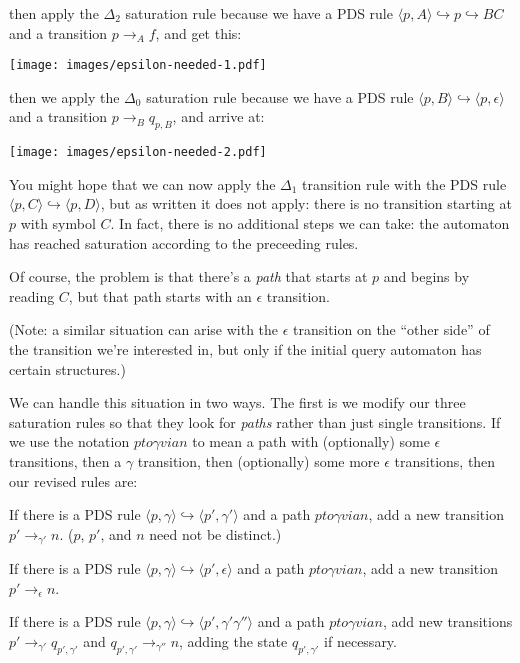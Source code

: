 \documentclass{article}
\newcommand{\Config}[2]{\ensuremath{\langle #1, #2 \rangle}}
\newcommand{\Rule}[2]{\ensuremath{#1 \hookrightarrow #2}}
\newcommand{\Trans}[3]{\ensuremath{#1 \rightarrow_{#2} #3}}
\newcommand{\epspath}[3]{\ensuremath{#1 to #2 via #3}}
\begin{document}
then apply the $\Delta_2$ saturation rule because we have a PDS rule
\Rule{\Config{p}{A}}{\Rule{p}{B C}} and a transition \Trans{p}{A}{f},
and get this:
\begin{center}
  \texttt{[image: images/epsilon-needed-1.pdf]}
\end{center}

then we apply the $\Delta_0$ saturation rule because we have a PDS
rule \Rule{\Config{p}{B}}{\Config{p}{\epsilon}} and a transition
\Trans{p}{B}{q_{p,B}}, and arrive at:
\begin{center}
  \texttt{[image: images/epsilon-needed-2.pdf]}
\end{center}

You might hope that we can now apply the $\Delta_1$ transition rule
with the PDS rule \Rule{\Config{p}{C}}{\Config{p}{D}}, but as written
it does not apply: there is no transition starting at $p$ with symbol
$C$. In fact, there is no additional steps we can take: the automaton
has reached saturation according to the preceeding rules.

Of course, the problem is that there's a \emph{path} that starts at
$p$ and begins by reading $C$, but that path starts with an $\epsilon$
transition.

(Note: a similar situation can arise with the $\epsilon$ transition on
the ``other side'' of the transition we're interested in, but only if
the initial query automaton has certain structures.)

We can handle this situation in two ways. The first is we modify our
three saturation rules so that they look for \emph{paths} rather than
just single transitions. If we use the notation \epspath{p}{\gamma}{n}
to mean a path with (optionally) some $\epsilon$ transitions, then a
$\gamma$ transition, then (optionally) some more $\epsilon$ transitions,
then our revised rules are:


   If there is a PDS rule
   \Rule{\Config{p}{\gamma}}{\Config{p'}{\gamma'}} and a path
   \epspath{p}{\gamma}{n}, add a new transition
   \Trans{p'}{\gamma'}{n}. ($p$, $p'$, and $n$ need not be distinct.)

   If there is a PDS rule
   \Rule{\Config{p}{\gamma}}{\Config{p'}{\epsilon}} and a path
   \epspath{p}{\gamma}{n}, add a new transition
   \Trans{p'}{\epsilon}{n}.

   If there is a PDS rule
   \Rule{\Config{p}{\gamma}}{\Config{p'}{\gamma'\gamma''}} and a path
   \epspath{p}{\gamma}{n}, add new transitions
   \Trans{p'}{\gamma'}{q_{p',\gamma'}} and
   \Trans{q_{p',\gamma'}}{\gamma''}{n}, adding the state
   $q_{p',\gamma'}$ if necessary.
\end{document}

